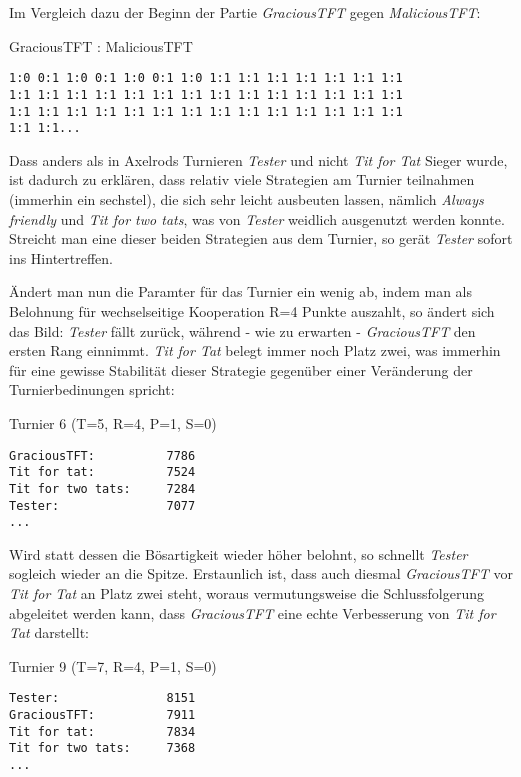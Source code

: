 \documentclass[12pt,a4paper,ngerman]{article}
\begin{document}
Im Vergleich dazu der Beginn der Partie {\em GraciousTFT} gegen {\em
  MaliciousTFT}:

\begin{scriptsize}
\begin{center}GraciousTFT : MaliciousTFT\end{center}
\begin{verbatim}
1:0 0:1 1:0 0:1 1:0 0:1 1:0 1:1 1:1 1:1 1:1 1:1 1:1 1:1 
1:1 1:1 1:1 1:1 1:1 1:1 1:1 1:1 1:1 1:1 1:1 1:1 1:1 1:1 
1:1 1:1 1:1 1:1 1:1 1:1 1:1 1:1 1:1 1:1 1:1 1:1 1:1 1:1 
1:1 1:1...
\end{verbatim}
\end{scriptsize}

Dass anders als in Axelrods Turnieren {\em Tester} und nicht {\em Tit for Tat}
Sieger wurde, ist dadurch zu erklären, dass relativ viele Strategien am
Turnier teilnahmen (immerhin ein sechstel), die sich sehr leicht ausbeuten
lassen, nämlich {\em Always friendly} und {\em Tit for two tats}, was von {\em
  Tester} weidlich ausgenutzt werden konnte. Streicht man eine dieser beiden
Strategien aus dem Turnier, so gerät {\em Tester} sofort ins Hintertreffen.

Ändert man nun die Paramter für das Turnier ein wenig ab, indem man
als Belohnung für wechselseitige Kooperation R=4 Punkte auszahlt, so
ändert sich das Bild: {\em Tester} fällt zurück, während - wie zu
erwarten - {\em GraciousTFT} den ersten Rang einnimmt. {\em Tit for
Tat} belegt immer noch Platz zwei, was immerhin für eine gewisse
Stabilität dieser Strategie gegenüber einer Veränderung der
Turnierbedinungen spricht:

\begin{scriptsize}
\begin{center}Turnier 6 (T=5, R=4, P=1, S=0) \end{center}
\begin{verbatim}
GraciousTFT:          7786
Tit for tat:          7524
Tit for two tats:     7284
Tester:               7077
...
\end{verbatim}
\end{scriptsize}

Wird statt dessen die Bösartigkeit wieder höher belohnt, so schnellt {\em
  Tester} sogleich wieder an die Spitze. Erstaunlich ist, dass auch diesmal
{\em GraciousTFT} vor {\em Tit for Tat} an Platz zwei steht, woraus
vermutungsweise die Schlussfolgerung abgeleitet werden kann, dass {\em
  GraciousTFT} eine echte Verbesserung von {\em Tit for Tat} darstellt:

\begin{scriptsize}
\begin{center}Turnier 9 (T=7, R=4, P=1, S=0) \end{center}
\begin{verbatim}
Tester:               8151
GraciousTFT:          7911
Tit for tat:          7834
Tit for two tats:     7368
...
\end{verbatim}
\end{scriptsize}
\end{document}
